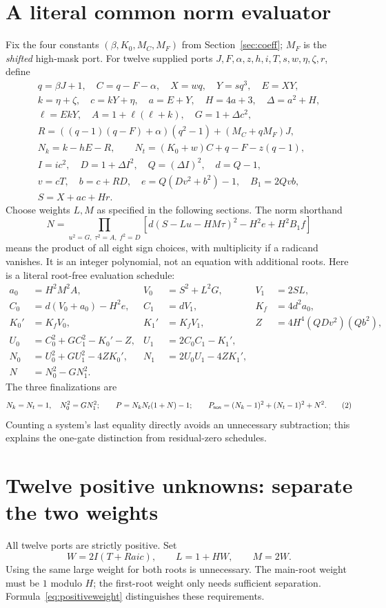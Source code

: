 \documentclass[11pt]{article}
\begin{document}
\section{A literal common norm evaluator}
Fix the four constants $(\beta,K_0,M_C,M_F)$ from Section~\ref{sec:coeff};
$M_F$ is the \emph{shifted} high-mask port. For twelve supplied ports
$J,F,\alpha,z,h,i,T,s,w,\eta,\zeta,r$, define
\begin{gather*}
 q=\beta J+1,\quad C=q-F-\alpha,\quad X=wq,\quad Y=sq^3,\quad E=XY,\\
 k=\eta+\zeta,\quad c=kY+\eta,\quad a=E+Y,\quad H=4a+3,\quad \Delta=a^2+H,\\
 \ell=EkY,\quad A=1+\ell(\ell+k),\quad G=1+\Delta c^2,\\
 R=((q-1)(q-F)+\alpha)(q^2-1)+(M_C+qM_F)J,\\
 N_k=k-hE-R,\qquad N_t=(K_0+w)C+q-F-z(q-1),\\
 I=ic^2,\quad D=1+\Delta I^2,\quad Q=(\Delta I)^2,\quad d=Q-1,\\
 v=cT,\quad b=c+RD,\quad e=Q(Dv^2+b^2)-1,\quad B_1=2Qvb,\\
 S=X+ac+Hr.
\end{gather*}
Choose weights $L,M$ as specified in the following sections. The norm shorthand
\[
 N=\prod_{u^2=G,\;\tau^2=A,\;f^2=D}
 \left[d(S-Lu-HM\tau)^2-H^2e+H^2B_1f\right]
\tag{1}\label{eq:norm}
\]
means the product of all eight sign choices, with multiplicity if a radicand
vanishes. It is an integer polynomial, not an equation with additional roots.
Here is a literal root-free evaluation schedule:
\begin{align*}
 a_0&=H^2M^2A,&V_0&=S^2+L^2G,&V_1&=2SL,\\
 C_0&=d(V_0+a_0)-H^2e,&C_1&=dV_1,&K_f&=4d^2a_0,\\
 K_0'&=K_fV_0,&K_1'&=K_fV_1,&Z&=4H^4(QDv^2)(Qb^2),\\
 U_0&=C_0^2+GC_1^2-K_0'-Z,&U_1&=2C_0C_1-K_1',\\
 N_0&=U_0^2+GU_1^2-4ZK_0',&N_1&=2U_0U_1-4ZK_1',\\
 N&=N_0^2-GN_1^2.&&&
\end{align*}
The three finalizations are
\[
 N_k=N_t=1,\quad N_0^2=GN_1^2;\qquad
 P=N_kN_t(1+N)-1;\qquad
 P_{\rm sos}=(N_k-1)^2+(N_t-1)^2+N^2.
\tag{2}\label{eq:finals}
\]
Counting a system's last equality directly avoids an unnecessary subtraction;
this explains the one-gate distinction from residual-zero schedules.

\section{Twelve positive unknowns: separate the two weights}
All twelve ports are strictly positive. Set
\[
 W=2I(T+Raic),\qquad L=1+HW,\qquad M=2W.
\tag{3}\label{eq:positiveweight}
\]
Using the same large weight for both roots is unnecessary. The main-root
weight must be $1$ modulo $H$; the first-root weight only needs sufficient
separation. Formula~\eqref{eq:positiveweight} distinguishes these requirements.
\end{document}
